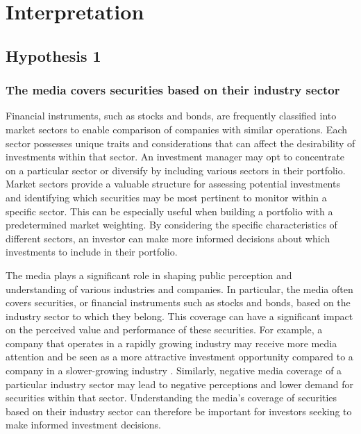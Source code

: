 \chapter{Interpretation}
\label{cha:interpretation}

\section{Hypothesis 1}
\label{cha:hypothesis-1}
\subsection{The media covers securities based on their industry sector}

Financial instruments, such as stocks and bonds, are frequently classified into market sectors to enable comparison of companies with similar operations. Each sector possesses unique traits and considerations that can affect the desirability of investments within that sector. An investment manager may opt to concentrate on a particular sector or diversify by including various sectors in their portfolio.
Market sectors provide a valuable structure for assessing potential investments and identifying which securities may be most pertinent to monitor within a specific sector. This can be especially useful when building a portfolio with a predetermined market weighting. By considering the specific characteristics of different sectors, an investor can make more informed decisions about which investments to include in their portfolio. \cite{globex:online}

The media plays a significant role in shaping public perception and understanding of various industries and companies. In particular, the media often covers securities, or financial instruments such as stocks and bonds, based on the industry sector to which they belong. This coverage can have a significant impact on the perceived value and performance of these securities. For example, a company that operates in a rapidly growing industry may receive more media attention and be seen as a more attractive investment opportunity compared to a company in a slower-growing industry \cite{MediaCov52:online}. Similarly, negative media coverage of a particular industry sector may lead to negative perceptions and lower demand for securities within that sector. Understanding the media's coverage of securities based on their industry sector can therefore be important for investors seeking to make informed investment decisions.


